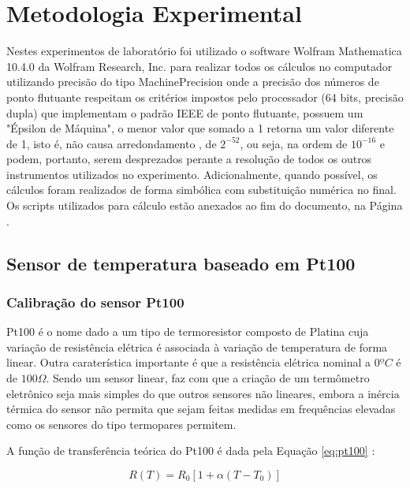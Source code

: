 \documentclass[a4paper]{instrumentacao}
\begin{document}
\chapter{Metodologia Experimental}

Nestes experimentos de laboratório foi utilizado o software Wolfram Mathematica 10.4.0 da Wolfram Research, Inc. para realizar todos os cálculos no computador utilizando precisão do tipo MachinePrecision\cite{mathematica-numerial-precision} onde a precisão dos números de ponto flutuante respeitam os critérios impostos pelo processador (64 bits, precisão dupla) que implementam o padrão IEEE de ponto flutuante, possuem um "Épsilon de Máquina", o menor valor que somado a 1 retorna um valor diferente de 1, isto é, não causa arredondamento \cite{wikipedia-epsilon}, de $2^{-52}$, ou seja, na ordem de $10^{-16}$ e podem, portanto, serem desprezados perante a resolução de todos os outros instrumentos utilizados no experimento. Adicionalmente, quando possível, os cálculos foram realizados de forma simbólica com substituição numérica no final. Os scripts utilizados para cálculo estão anexados ao fim do documento, na Página \pageref{ch:attachments}.

\section{Sensor de temperatura baseado em Pt100}
\label{ch:pt100}

\subsection{Calibração do sensor Pt100}
\label{sec:resistencia-pt100}

Pt100 é o nome dado a um tipo de termoresistor composto de Platina cuja variação de resistência elétrica é associada à variação de temperatura de forma linear. Outra caraterística importante é que a resistência elétrica nominal a $0ºC$ é de $100 \Omega$. Sendo um sensor linear, faz com que a criação de um termômetro eletrônico seja mais simples do que outros sensores não lineares, embora a inércia térmica do sensor não permita que sejam feitas medidas em frequências elevadas como os sensores do tipo termopares permitem.

A função de transferência teórica do Pt100 é dada pela Equação \ref{eq:pt100} \cite{livro-texto}:

\begin{equation}
	R(T) = R_0 \left[1 + \alpha\left(T - T_0\right)\right]
	\label{eq:pt100}
\end{equation}
\end{document}
